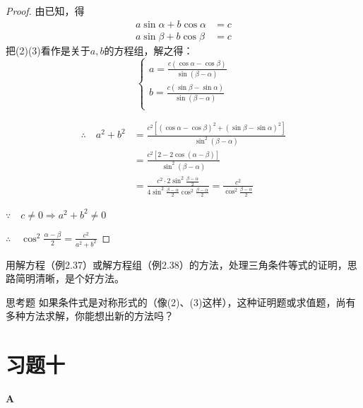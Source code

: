 \begin{proof}
    由已知，得
\begin{align}
    a\sin\alpha+b\cos\alpha&=c \tag{2}\\
    a\sin\beta+b\cos\beta&=c \tag{3}
\end{align}
把(2)(3)看作是关于$a,b$的方程组，解之得：
\begin{equation}
    \begin{cases}
        a=\frac{c(\cos\alpha-\cos\beta)}{\sin(\beta-\alpha)}\\[1.5ex]
        b=\frac{c(\sin\beta-\sin\alpha)}{\sin(\beta-\alpha)}\\
    \end{cases}\tag{4}
\end{equation}

\[\begin{split}
    \therefore\quad a^2+b^2&=\frac{c^2[(\cos\alpha-\cos\beta)^2+(\sin\beta-\sin\alpha)^2]}{\sin^2(\beta-\alpha)}\\
    &=\frac{c^2[2-2\cos(\alpha-\beta)]}{\sin^2(\beta-\alpha)}\\
&=\frac{c^2\cdot 2\sin^2\frac{\beta-\alpha}{2}}{4\sin^2\frac{\beta-\alpha}{2}\cos^2\frac{\beta-\alpha}{2}}=\frac{c^2}{\cos^2\frac{\beta-\alpha}{2}}
\end{split}\]

$\because\quad c\ne 0\Rightarrow a^2+b^2\ne 0$

$\therefore\quad \cos^2\frac{\alpha-\beta}{2}=\frac{c^2}{a^2+b^2}$
\end{proof}

\begin{remark}
用解方程（例2.37）或解方程组（例2.38）的方法，处理三角条件等式的证明，思路简明清晰，是个好方法。
\end{remark}

\begin{thm}
{思考题} 如果条件式是对称形式的（像(2)、(3)这样），这种证明题或求值题，尚有多种方法求解，你能想出新的方法吗？  
\end{thm}

\section*{习题十}
\begin{center}
    \bfseries A
\end{center}

